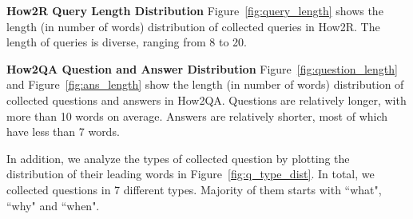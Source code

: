 \documentclass[11pt,a4paper]{article}
\begin{document}
\vspace{5pt}
\noindent \textbf{How2R Query Length Distribution}
Figure~\ref{fig:query_length} shows the length (in number of words) distribution of collected queries in How2R. The length of queries is diverse, ranging from 8 to 20. 

\vspace{5pt}
\noindent \textbf{How2QA Question and Answer Distribution}
Figure~\ref{fig:question_length} and Figure~\ref{fig:ans_length} show the length (in number of words) distribution of collected questions and answers in How2QA. Questions are relatively longer, with more than 10 words on average. Answers are relatively shorter, most of which have less than 7 words. 

In addition, we analyze the types of collected question by plotting the distribution of their leading words in Figure~\ref{fig:q_type_dist}. In total, we collected questions in 7 different types. Majority of them starts with ``what", ``why" and ``when".



 
 
\end{document}

